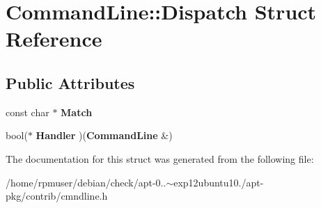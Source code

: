 \section{\-Command\-Line\-:\-:\-Dispatch \-Struct \-Reference}
\label{structCommandLine_1_1Dispatch}
\subsection*{\-Public \-Attributes}
\begin{DoxyCompactItemize}
\item 
const char $\ast$ {\bfseries \-Match}\label{structCommandLine_1_1Dispatch_a7ae1a6dba6f516b306d5ef18c4f81960}

\item 
bool($\ast$ {\bfseries \-Handler} )({\bf \-Command\-Line} \&)\label{structCommandLine_1_1Dispatch_a31f4bca978f0b9cca71b169fb6140161}

\end{DoxyCompactItemize}


\-The documentation for this struct was generated from the following file\-:\begin{DoxyCompactItemize}
\item 
/home/rpmuser/debian/check/apt-\/0..$\sim$exp12ubuntu10./apt-\/pkg/contrib/cmndline.\-h\end{DoxyCompactItemize}
